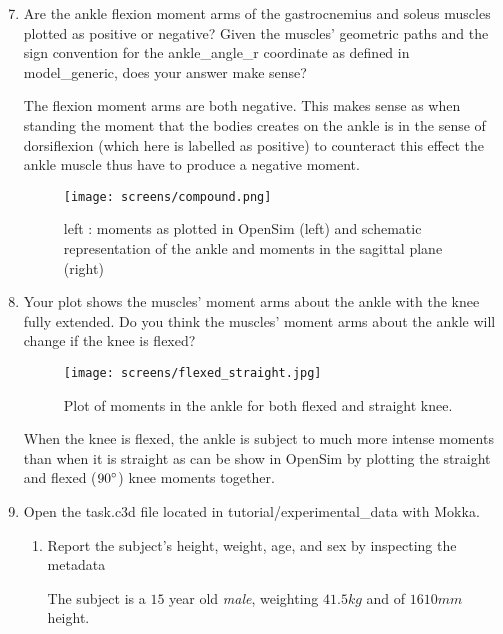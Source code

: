 \documentclass[11pt]{article}
\begin{document}
\begin{enumerate}
    \setcounter{enumi}{6}
    \item Are the ankle flexion moment arms of the gastrocnemius and soleus muscles plotted as positive or negative? Given the muscles’ geometric paths and the sign convention for the ankle\_angle\_r coordinate as defined in model\_generic, does your answer make sense?
    \begin{adjustwidth}{0.5cm}{}
        The flexion moment arms are both negative. This makes sense as when standing the moment that the bodies creates on the ankle is in the sense of dorsiflexion (which here is labelled as positive) to counteract this effect the ankle muscle thus have to produce a negative moment.
        \begin{figure}[h!]
            \centering
            \texttt{[image: screens/compound.png]}
            \caption{left : moments as plotted in OpenSim (left) and schematic representation of the ankle and moments in the sagittal plane (right)}
        \end{figure}
    \end{adjustwidth}
    \item Your plot shows the muscles’ moment arms about the ankle with the knee fully extended. Do you think the muscles’ moment arms about the ankle will change if the knee is flexed?
    \begin{adjustwidth}{0.5cm}{}
        \begin{figure}[h!]
            \centering
            \texttt{[image: screens/flexed\_straight.jpg]}
            \caption{Plot of moments in the ankle for both flexed and straight knee.}
        \end{figure}
        When the knee is flexed, the ankle is subject to much more intense moments than when it is straight as can be show in OpenSim by plotting the straight and flexed ($90\degree$) knee moments together.
    \end{adjustwidth}
    \item Open the task.c3d file located in tutorial/experimental\_data with Mokka.
    \begin{enumerate}
        \item Report the subject's height, weight, age, and sex by inspecting the metadata
        \begin{adjustwidth}{0.5cm}{}
            The subject is a $15$ year old \textit{male}, weighting $41.5kg$ and of $1610mm$ height.
        \end{adjustwidth}

\end{enumerate}
\end{enumerate}
\end{document}
